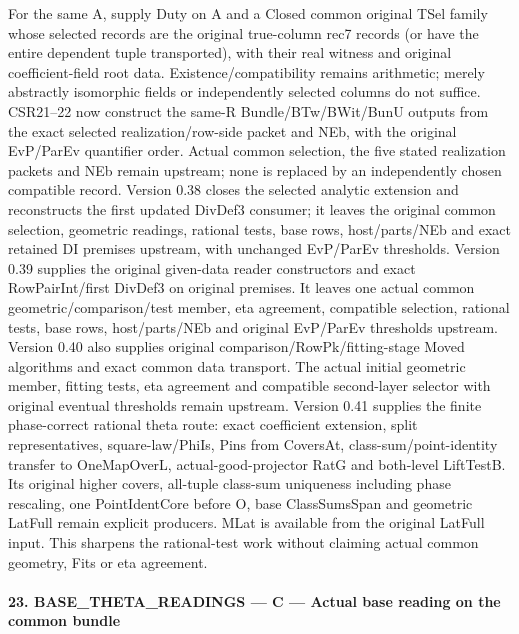 For the same A, supply Duty on A and a Closed common original TSel family whose selected records are the original true-column rec7 records (or have the entire dependent tuple transported), with their real witness and original coefficient-field root data. Existence/compatibility remains arithmetic; merely abstractly isomorphic fields or independently selected columns do not suffice. CSR21–22 now construct the same-R Bundle/BTw/BWit/BunU outputs from the exact selected realization/row-side packet and NEb, with the original EvP/ParEv quantifier order. Actual common selection, the five stated realization packets and NEb remain upstream; none is replaced by an independently chosen compatible record. Version 0.38 closes the selected analytic extension and reconstructs the first updated DivDef3 consumer; it leaves the original common selection, geometric readings, rational tests, base rows, host/parts/NEb and exact retained DI premises upstream, with unchanged EvP/ParEv thresholds. Version 0.39 supplies the original given-data reader constructors and exact RowPairInt/first DivDef3 on original premises. It leaves one actual common geometric/comparison/test member, eta agreement, compatible selection, rational tests, base rows, host/parts/NEb and original EvP/ParEv thresholds upstream. Version 0.40 also supplies original comparison/RowPk/fitting-stage Moved algorithms and exact common data transport. The actual initial geometric member, fitting tests, eta agreement and compatible second-layer selector with original eventual thresholds remain upstream. Version 0.41 supplies the finite phase-correct rational theta route: exact coefficient extension, split representatives, square-law/PhiIs, Pins from CoversAt, class-sum/point-identity transfer to OneMapOverL, actual-good-projector RatG and both-level LiftTestB. Its original higher covers, all-tuple class-sum uniqueness including phase rescaling, one PointIdentCore before O, base ClassSumsSpan and geometric LatFull remain explicit producers. MLat is available from the original LatFull input. This sharpens the rational-test work without claiming actual common geometry, Fits or eta agreement.



\paragraph{23. BASE\_\allowbreak THETA\_\allowbreak READINGS — C — Actual base reading on the common bundle}

